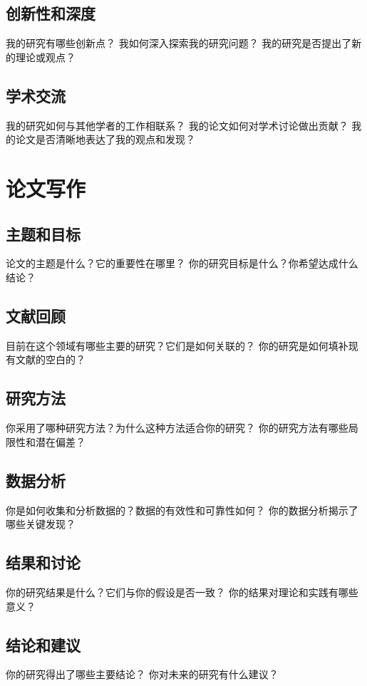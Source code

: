 \documentclass[12pt]{book}
\begin{document}
\subsection{创新性和深度}
我的研究有哪些创新点？
我如何深入探索我的研究问题？
我的研究是否提出了新的理论或观点？

\subsection{学术交流}
我的研究如何与其他学者的工作相联系？
我的论文如何对学术讨论做出贡献？
我的论文是否清晰地表达了我的观点和发现？

\section{论文写作}
\subsection{主题和目标}
论文的主题是什么？它的重要性在哪里？
你的研究目标是什么？你希望达成什么结论？

\subsection{文献回顾}
目前在这个领域有哪些主要的研究？它们是如何关联的？
你的研究是如何填补现有文献的空白的？

\subsection{研究方法}
你采用了哪种研究方法？为什么这种方法适合你的研究？
你的研究方法有哪些局限性和潜在偏差？

\subsection{数据分析}
你是如何收集和分析数据的？数据的有效性和可靠性如何？
你的数据分析揭示了哪些关键发现？

\subsection{结果和讨论}
你的研究结果是什么？它们与你的假设是否一致？
你的结果对理论和实践有哪些意义？

\subsection{结论和建议}
你的研究得出了哪些主要结论？
你对未来的研究有什么建议？
\end{document}
